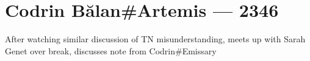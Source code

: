 \hypertarget{codrin-bux103lanartemis-2346}{%
\chapter{Codrin Bălan\#Artemis — 2346}\label{codrin-bux103lanartemis-2346}}

After watching similar discussion of TN misunderstanding, meets up with Sarah Genet over break, discusses note from Codrin\#Emissary
